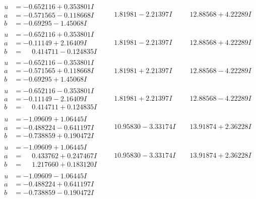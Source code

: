 \documentclass[1p]{elsarticle_modified}
\theoremstyle{definition}
\begin{document}
$$\begin{array}{c|c|c}
\begin{aligned}
u &= -0.652116 + 0.353801 I \\
a &= -0.571565 - 0.118668 I \\
b &= -0.69295 - 1.45068 I\end{aligned}
 & \phantom{-}1.81981 - 2.21397 I & \phantom{-}12.88568 + 4.22289 I \\ \hline\begin{aligned}
u &= -0.652116 + 0.353801 I \\
a &= -0.11149 + 2.16409 I \\
b &= \phantom{-}0.414711 - 0.124835 I\end{aligned}
 & \phantom{-}1.81981 - 2.21397 I & \phantom{-}12.88568 + 4.22289 I \\ \hline\begin{aligned}
u &= -0.652116 - 0.353801 I \\
a &= -0.571565 + 0.118668 I \\
b &= -0.69295 + 1.45068 I\end{aligned}
 & \phantom{-}1.81981 + 2.21397 I & \phantom{-}12.88568 - 4.22289 I \\ \hline\begin{aligned}
u &= -0.652116 - 0.353801 I \\
a &= -0.11149 - 2.16409 I \\
b &= \phantom{-}0.414711 + 0.124835 I\end{aligned}
 & \phantom{-}1.81981 + 2.21397 I & \phantom{-}12.88568 - 4.22289 I \\ \hline\begin{aligned}
u &= -1.09609 + 1.06445 I \\
a &= -0.488224 - 0.641197 I \\
b &= -0.738859 + 0.190472 I\end{aligned}
 & \phantom{-}10.95830 - 3.33174 I & \phantom{-}13.91874 + 2.36228 I \\ \hline\begin{aligned}
u &= -1.09609 + 1.06445 I \\
a &= \phantom{-}0.433762 + 0.247467 I \\
b &= \phantom{-}1.217660 + 0.183120 I\end{aligned}
 & \phantom{-}10.95830 - 3.33174 I & \phantom{-}13.91874 + 2.36228 I \\ \hline\begin{aligned}
u &= -1.09609 - 1.06445 I \\
a &= -0.488224 + 0.641197 I \\
b &= -0.738859 - 0.190472 I\end{aligned}

\end{array}$$
\end{document}
